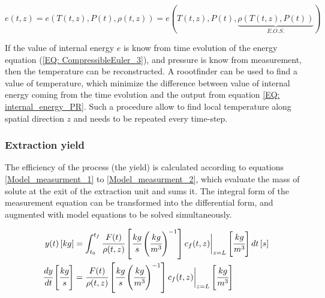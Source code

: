\documentclass[../Article_Model_Parameters.tex]{subfiles}
\begin{document}
{\begin{minipage}{\columnwidth}
			{\footnotesize
			\begin{equation*}
				e(t,z)=e(T(t,z),P(t),\rho(t,z))=e(T(t,z),P(t),\underbrace{\rho(T(t,z),P(t))}_{E.O.S.}) 
			\end{equation*}
			}
		
			If the value of internal energy $e$ is know from time evolution of the energy equation (\ref{EQ: CompressibleEuler_3}), and pressure is know from measurement, then the temperature can be reconstructed. A roootfinder can be used to find a value of temperature, which minimize the difference between value of internal energy coming from the time evolution and the output from equation \ref{EQ: internal_energy_PR}. Such a procedure allow to find local temperature along spatial direction $z$ and needs to be repeated every time-step.
			
			
		\end{minipage} }
	
  
		\subsubsection{Extraction yield} \label{CH: Yield} 
			
		The efficiency of the process (the yield) is calculated according to equations \ref{Model_measurment_1} to \ref{Model_measurment_2}, which evaluate the mass of solute at the exit of the extraction unit and sums it. The integral form of the measurement equation can be transformed into the differential form, and augmented with model equations to be solved simultaneously.
			
		{\footnotesize
			\begin{align} 
				\label{Model_measurment_1}
				y(t) \left[ kg \right] &= \int_{t_0}^{t_f} \cfrac{F(t)}{\rho(t,z)} \left[ \cfrac{kg}{s} \left( \cfrac{kg}{m^3} \right)^{-1} \right] c_f(t,z) \biggr\rvert_{z=L} \left[ \cfrac{kg}{m^3} \right] dt \left[ s \right] 	\\
				\cfrac{dy}{dt} \left[ \cfrac{kg}{s} \right] &= \cfrac{F(t)}{\rho(t,z)} \left[ \cfrac{kg}{s} \left( \cfrac{kg}{m^3} \right)^{-1} \right] c_f(t,z) \biggr\rvert_{z=L} \left[ \cfrac{kg}{m^3} \right]
                \label{Model_measurment_2}
		\end{align}	}
			
\end{document}
